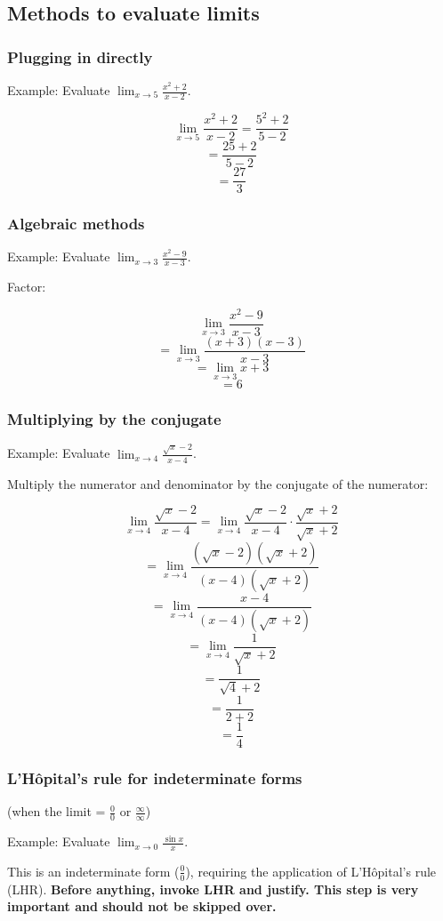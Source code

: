 \documentclass[letterpaper, 12pt]{article}
\begin{document}
\subsection*{Methods to evaluate limits}

\subsubsection*{Plugging in directly}
Example: Evaluate $\displaystyle\lim_{x \to 5} \frac{x^2+2}{x-2}$.


$$ \lim_{x \to 5} \frac{x^2+2}{x-2} = \frac{5^2+2}{5-2} $$
$$ = \frac{25+2}{5-2} $$
$$ = \boxed{\frac{27}{3}} $$

\subsubsection*{Algebraic methods}
Example: Evaluate $\displaystyle\lim_{x \to 3} \frac{x^2-9}{x-3}$.

Factor:

$$\lim_{x \to 3} \frac{x^2-9}{x-3}$$
$$ = \lim_{x \to 3} \frac{(x+3)(x-3)}{x-3}$$
$$ = \lim_{x \to 3} x+3$$
$$ = \boxed{6}$$

\subsubsection*{Multiplying by the conjugate}
Example: Evaluate $\displaystyle \lim_{x \to 4} \frac{\sqrt{x} - 2}{x - 4} $.

Multiply the numerator and denominator by the conjugate of the numerator:

$$  \lim_{x \to 4} \frac{\sqrt{x} - 2}{x - 4} = \lim_{x \to 4} \frac{\sqrt{x} - 2}{x - 4} \cdot \frac{\sqrt{x} + 2}{\sqrt{x} + 2} $$
$$ = \lim_{x \to 4} \frac{(\sqrt{x} - 2)(\sqrt{x} + 2)}{(x - 4)(\sqrt{x} + 2)} $$  
$$ = \lim_{x \to 4} \frac{x - 4}{(x - 4)(\sqrt{x} + 2)} $$
$$ = \lim_{x \to 4} \frac{1}{\sqrt{x} + 2} $$
$$ = \frac{1}{\sqrt{4} + 2} $$  
$$ = \frac{1}{2 + 2} $$  
$$ = \boxed{\frac{1}{4}} $$


\subsubsection*{L'Hôpital's rule for indeterminate forms}
(when the limit = $\frac{0}{0}$ or $\frac{\infty}{\infty}$)

Example: Evaluate $\displaystyle \lim_{x \to 0} \frac{\sin x}{x} $.

This is an indeterminate form ($\frac{0}{0}$), requiring the application of L'Hôpital's rule (LHR). \textbf{Before anything, invoke LHR and justify. This step is very important and should not be skipped over.}
\end{document}
